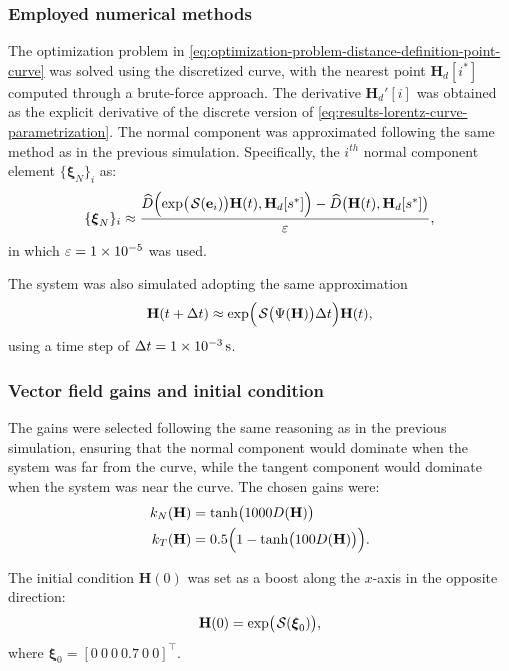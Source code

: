 \subsubsection{Employed numerical methods}
The optimization problem in \eqref{eq:optimization-problem-distance-definition-point-curve} was solved using the discretized curve, with the nearest point $\mathbf{H}_d[i^*]$ computed through a brute-force approach. The derivative $\mathbf{H}_d'[i]$ was obtained as the explicit derivative of the discrete version of \eqref{eq:results-lorentz-curve-parametrization}. The normal component was approximated following the same method as in the previous simulation. Specifically, the $i^{th}$ normal component element $\{\boldsymbol{\xi}_{N}\}_{i}$ as:
\begin{align}
    \{\boldsymbol{\xi}_{N}\}_{i} \approx \frac{\widehat{D}\Bigl(\exp\bigl(\SL[\boldsymbol{\mathbf{e}}_i]\bigr)\mathbf{H}(t), \mathbf{H}_d[s^*]\Bigr) - \widehat{D}\bigl(\mathbf{H}(t), \mathbf{H}_d[s^*]\bigr)}{\varepsilon},
\end{align} 
in which $\varepsilon = \num{1E-5}$ was used.

The system was also simulated adopting the same approximation
\begin{align}
    \mathbf{H}(t + \Delta t) \approx \exp\Bigl(\SL\bigl(\Psi(\mathbf{H})\bigr)\Delta t\Bigr)\mathbf{H}(t),
\end{align}
using a time step of $\Delta t = \qty{1E-3}{\second}$.
\subsubsection{Vector field gains and initial condition}
The gains were selected following the same reasoning as in the previous simulation, ensuring that the normal component would dominate when the system was far from the curve, while the tangent component would dominate when the system was near the curve. The chosen gains were:
\begin{align}
    k_N(\mathbf{H}) &= \tanh\bigl(\num{1000}D(\mathbf{H})\bigr)\\
    k_T(\mathbf{H}) &= 0.5\Bigl(1 - \tanh\bigl(100D(\mathbf{H})\bigr)\Bigr).
\end{align}

The initial condition $\mathbf{H}(0)$ was set as a boost along the $x$-axis in the opposite direction:
\begin{align}
    \mathbf{H}(0) = \exp\bigl(\SL[\boldsymbol{\xi}_0]\bigr),
\end{align}
where $\boldsymbol{\xi}_0 = [0\ 0\ 0\ 0.7\ 0\ 0]^\top$.
